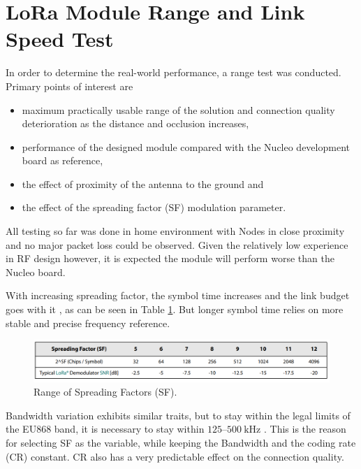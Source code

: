 
\section{\label{section:range-test}LoRa Module Range and Link Speed Test}
In order to determine the real-world performance, a range test was conducted. Primary points of interest are
\begin{itemize}
    \item maximum practically usable range of the solution and connection quality deterioration as the distance and occlusion increases,
    \item performance of the designed module compared with the Nucleo development board as reference,
    \item the effect of proximity of the antenna to the ground and
    \item the effect of the spreading factor (SF) modulation parameter.
\end{itemize}

All testing so far was done in home environment with Nodes in close proximity and no major packet loss could be observed. Given the relatively low experience in RF design however, it is expected the module will perform worse than the Nucleo board.

With increasing spreading factor, the symbol time increases and the link budget goes with it \cite{semtech_corporation_sx12612_2024}, as can be seen in Table \ref{table:semtech-sf}. But longer symbol time relies on more stable and precise frequency reference. 

\begin{figure}[H]
    \includegraphics[width=\textwidth]{fig/semtech-sf-table.png}
    \caption{\label{table:semtech-sf}Range of Spreading Factors (SF).}
\end{figure}

Bandwidth variation exhibits similar traits, but to stay within the legal limits of the EU868 band, it is necessary to stay within $125\text{--}500~\mathrm{kHz}$ \cite{etsi_short_2018,the_things_network_eu863-870_nodate}. This is the reason for selecting SF as the variable, while keeping the Bandwidth and the coding rate (CR) constant. CR also has a very predictable effect on the connection quality.

